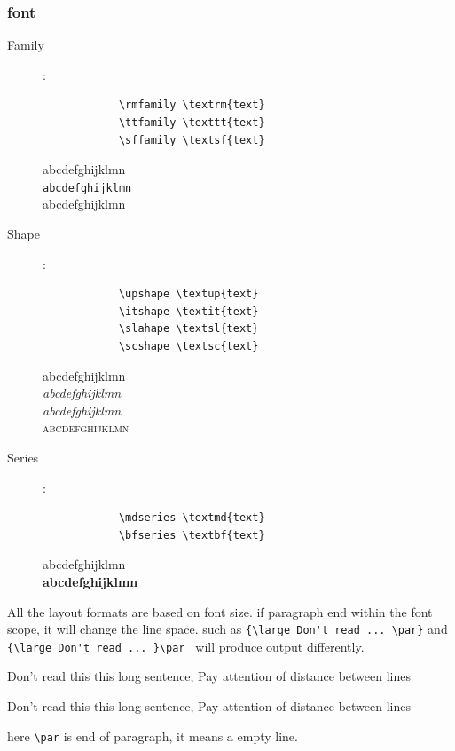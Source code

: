 \documentclass[a4paper,12pt,twoside]{book}
\begin{document}
		\subsubsection{font}
			\begin{description}
			\item[Family]:
			\begin{minipage}{0.45\textwidth}
			 \begin{verbatim}
			\rmfamily \textrm{text}
			\ttfamily \texttt{text}
			\sffamily \textsf{text}
			\end{verbatim}
			\end{minipage}
			\begin{minipage}{0.45\textwidth}
			\textrm{abcdefghijklmn} \\
			\texttt{abcdefghijklmn} \\
			\textsf{abcdefghijklmn}
			\end{minipage}
			
			\item[Shape]:
			\begin{minipage}{0.45\textwidth}
			\begin{verbatim}
			\upshape \textup{text}
			\itshape \textit{text}
			\slahape \textsl{text}
			\scshape \textsc{text}
			\end{verbatim}
			\end{minipage}
			\begin{minipage}{0.45\textwidth}
			 \textup{abcdefghijklmn} \\
			 \textit{abcdefghijklmn}\\
			 \textsl{abcdefghijklmn}\\
			 \textsc{abcdefghijklmn}
			\end{minipage}
			\item[Series]:
			\begin{minipage}{0.45\textwidth}
			\begin{verbatim}
			\mdseries \textmd{text}
			\bfseries \textbf{text}
			\end{verbatim}
			\end{minipage}
			\begin{minipage}{0.45\textwidth}
			\textmd{abcdefghijklmn} \\
			\textbf{abcdefghijklmn}
			\end{minipage}
			\end{description}\par
			All the layout formats are based on font size. if paragraph end within the font scope, it will change the line space. such as
			\verb={\large Don't read ... \par}= and \verb={\large Don't read ... }\par = will produce output differently. \par
			{\large Don't read this this long sentence, Pay attention of distance between lines \par}
			{\large Don't read this this long sentence, Pay attention of distance between lines }\par
			here \verb=\par= is end of paragraph, it means a empty line.	
			
\end{document}
